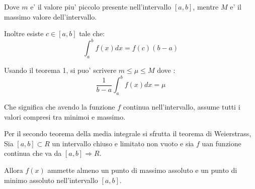 Dove $m$ e' il valore piu' piccolo presente nell'intervallo $[a, b]$, mentre $M$ e' il massimo valore
dell'intervallo.

Inoltre esiste $c \in [a, b]$ tale che:
\begin{equation*}
  \int_a^b f(x)dx = f(c)(b-a)
\end{equation*}

Usando il teorema 1, si puo' scrivere $m \leq \mu \leq M$ dove :
\begin{equation*}
  \frac{1}{b-a}\int_a^b f(x)dx = \mu
\end{equation*}

Che significa che avendo la funzione $f$ continua nell'intervallo, assume tutti i valori compresi tra minimoi e massimo.

Per il secondo teorema della media integrale si sfrutta il teorema di Weierstrass,
Sia $[a,b] \subset R$ un intervallo chiuso e limitato non vuoto e sia $f$ uan funzione continua che va da 
$[a,b] \Rightarrow R$.

Allora $f(x)$ ammette almeno un punto di massimo assoluto e un punto di minimo assoluto nell'intervallo
$[a, b]$.


